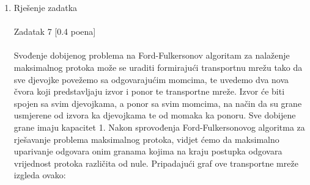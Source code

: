 \documentclass[12pt]{article}
\begin{document}
\begin{enumerate}
\item Rješenje zadatka \\
\\
Zadatak 7 [0.4 poena] \\
\\
Svođenje dobijenog problema na Ford-Fulkersonov algoritam za nalaženje maksimalnog protoka
može se uraditi formirajući transportnu mrežu tako da sve djevojke povežemo sa odgovarajućim
momcima, te uvedemo dva nova čvora koji predstavljaju izvor i ponor te transportne mreže. Izvor
će biti spojen sa svim djevojkama, a ponor sa svim momcima, na način da su grane usmjerene od
izvora ka djevojkama te od momaka ka ponoru. Sve dobijene grane imaju kapacitet 1. Nakon
sprovođenja Ford-Fulkersonovog algoritma za rješavanje problema maksimalnog protoka, vidjet
ćemo da maksimalno uparivanje odgovara onim granama kojima na kraju postupka odgovara
vrijednost protoka različita od nule. Pripadajući graf ove transportne mreže izgleda ovako:
\newpage
\end{enumerate}
\end{document}
